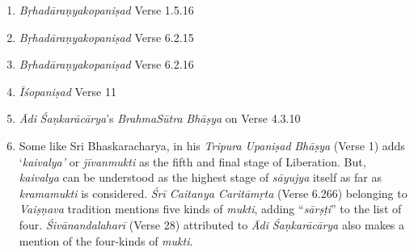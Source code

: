 \begin{enumerate}
\itemsep=0pt
\item
\emph{Bṛhadāraṇyakopaniṣad} Verse 1.5.16
\item
\emph{Bṛhadāraṇyakopaniṣad} Verse 6.2.15
\item
\emph{Bṛhadāraṇyakopaniṣad} Verse 6.2.16
\item
\emph{Īśopaniṣad} Verse 11
\item
\emph{Ādi} \emph{Śaṇkarācārya}'s \emph{BrahmaSūtra} \emph{Bhāṣya} on Verse 4.3.10
\item
Some like Sri Bhaskaracharya, in his \emph{Tripura} \emph{Upaniṣad} \emph{Bhāṣya} (Verse 1) adds `\emph{kaivalya'} or \emph{jīvanmukti} as the fifth and final stage of Liberation. But, \emph{kaivalya} can be understood as the highest stage of \emph{sāyujya} itself as far as \emph{kramamukti} is considered. \emph{Śrī Caitanya Caritāmṛta} (Verse 6.266) belonging to \emph{Vaiṣṇava} tradition mentions five kinds of \emph{mukti}, adding ``\emph{sārṣṭi}'' to the list of four. \emph{Śivānandalaharī} (Verse 28) attributed to \emph{Ādi} \emph{Śaṇkarācārya} also makes a mention of the four-kinds of \emph{mukti}.
\end{enumerate}
